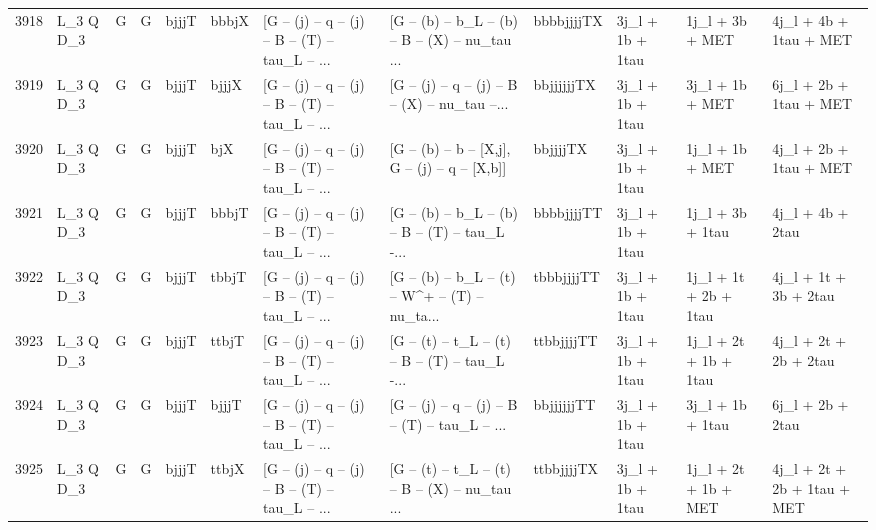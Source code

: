 \begin{tabular}{llllllllllll}
3918 &    L\_3 Q D\_3 &     G &     G &       bjjjT &       bbbjX &  [G -- (j) -- q -- (j) -- B -- (T) -- tau\_L -- ... &  [G -- (b) -- b\_L -- (b) -- B -- (X) -- nu\_tau ... &  bbbbjjjjTX &         3j\_l + 1b + 1tau &          1j\_l + 3b + MET &             4j\_l + 4b + 1tau + MET \\
3919 &    L\_3 Q D\_3 &     G &     G &       bjjjT &       bjjjX &  [G -- (j) -- q -- (j) -- B -- (T) -- tau\_L -- ... &  [G -- (j) -- q -- (j) -- B -- (X) -- nu\_tau --... &  bbjjjjjjTX &         3j\_l + 1b + 1tau &          3j\_l + 1b + MET &             6j\_l + 2b + 1tau + MET \\
3920 &    L\_3 Q D\_3 &     G &     G &       bjjjT &         bjX &  [G -- (j) -- q -- (j) -- B -- (T) -- tau\_L -- ... &   [G -- (b) -- b -- [X,j], G -- (j) -- q -- [X,b]] &    bbjjjjTX &         3j\_l + 1b + 1tau &          1j\_l + 1b + MET &             4j\_l + 2b + 1tau + MET \\
3921 &    L\_3 Q D\_3 &     G &     G &       bjjjT &       bbbjT &  [G -- (j) -- q -- (j) -- B -- (T) -- tau\_L -- ... &  [G -- (b) -- b\_L -- (b) -- B -- (T) -- tau\_L -... &  bbbbjjjjTT &         3j\_l + 1b + 1tau &         1j\_l + 3b + 1tau &                   4j\_l + 4b + 2tau \\
3922 &    L\_3 Q D\_3 &     G &     G &       bjjjT &       tbbjT &  [G -- (j) -- q -- (j) -- B -- (T) -- tau\_L -- ... &  [G -- (b) -- b\_L -- (t) -- W\textasciicircum + -- (T) -- nu\_ta... &  tbbbjjjjTT &         3j\_l + 1b + 1tau &    1j\_l + 1t + 2b + 1tau &              4j\_l + 1t + 3b + 2tau \\
3923 &    L\_3 Q D\_3 &     G &     G &       bjjjT &       ttbjT &  [G -- (j) -- q -- (j) -- B -- (T) -- tau\_L -- ... &  [G -- (t) -- t\_L -- (t) -- B -- (T) -- tau\_L -... &  ttbbjjjjTT &         3j\_l + 1b + 1tau &    1j\_l + 2t + 1b + 1tau &              4j\_l + 2t + 2b + 2tau \\
3924 &    L\_3 Q D\_3 &     G &     G &       bjjjT &       bjjjT &  [G -- (j) -- q -- (j) -- B -- (T) -- tau\_L -- ... &  [G -- (j) -- q -- (j) -- B -- (T) -- tau\_L -- ... &  bbjjjjjjTT &         3j\_l + 1b + 1tau &         3j\_l + 1b + 1tau &                   6j\_l + 2b + 2tau \\
3925 &    L\_3 Q D\_3 &     G &     G &       bjjjT &       ttbjX &  [G -- (j) -- q -- (j) -- B -- (T) -- tau\_L -- ... &  [G -- (t) -- t\_L -- (t) -- B -- (X) -- nu\_tau ... &  ttbbjjjjTX &         3j\_l + 1b + 1tau &     1j\_l + 2t + 1b + MET &        4j\_l + 2t + 2b + 1tau + MET \\

\end{tabular}
